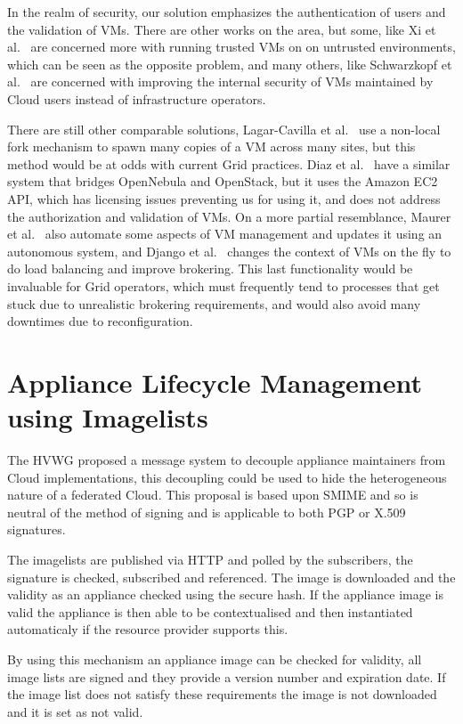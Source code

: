 \documentclass{cai}
\begin{document}
In the realm of security, our solution emphasizes the authentication of users and the validation of VMs. There are other works on the area, but some, like Xi et al.~\cite{Xi2012} are concerned more with running trusted VMs on on untrusted environments, which can be seen as the opposite problem, and many others, like Schwarzkopf et al.~\cite{Schwarzkopf2012} are concerned with improving the internal security of VMs maintained by Cloud users instead of infrastructure operators.

There are still other comparable solutions, Lagar-Cavilla et al.~\cite{Lagar-Cavilla2009} use a non-local fork mechanism to spawn many copies of a VM across many sites, but this method would be at odds with current Grid practices. Diaz et al.~\cite{Diaz2012} have a similar system that bridges OpenNebula and OpenStack, but it uses the Amazon EC2 API, which has licensing issues preventing us for using it, and does not address the authorization and validation of VMs. On a more partial resemblance, Maurer et al.~\cite{Maurer2013} also automate some aspects of VM management and updates it using an autonomous system, and Django et al.~\cite{Django2013} changes the context of VMs on the fly to do load balancing and improve brokering. This last functionality would be invaluable for Grid operators, which must frequently tend to processes that get stuck due to unrealistic brokering requirements, and would also avoid many downtimes due to reconfiguration.


\section{Appliance Lifecycle Management using Imagelists}
\label{sect-vmcaster}
The HVWG proposed a message system to decouple appliance maintainers from Cloud implementations, this decoupling could be used to hide the heterogeneous nature of a federated Cloud. 
This proposal is based upon SMIME and so is neutral of the method of signing and is applicable to both PGP or X.509 signatures.

The imagelists are published via HTTP and polled by the subscribers, the signature is checked, subscribed and referenced. The image is downloaded and the validity as an appliance checked using the secure hash. 
If the appliance image is valid the appliance is then able to be contextualised and then instantiated automaticaly if the resource provider supports this.

By using this mechanism an appliance image can be checked for validity, all image lists are signed and they provide a version number and expiration date. 
If the image list does not satisfy these requirements the image is not downloaded and it is set as not valid.
\end{document}
